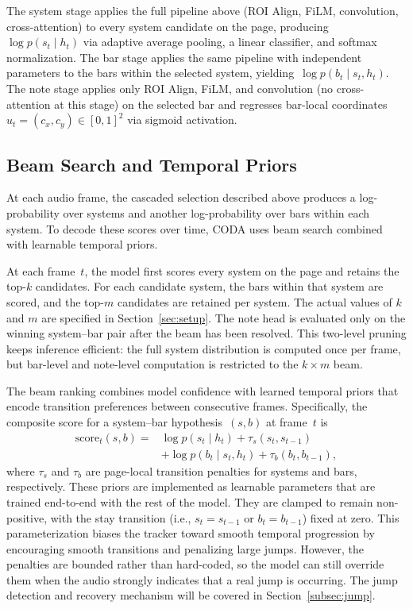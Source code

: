 The system stage applies the full pipeline above (ROI Align, FiLM, convolution, cross-attention) to every system candidate on the page, producing~$\log p(s_t \mid h_t)$ via adaptive average pooling, a linear classifier, and softmax normalization. The bar stage applies the same pipeline with independent parameters to the bars within the selected system, yielding~$\log p(b_t \mid s_t, h_t)$. The note stage applies only ROI Align, FiLM, and convolution (no cross-attention at this stage) on the selected bar and regresses bar-local coordinates~$u_t = (c_x, c_y) \in [0,1]^2$ via sigmoid activation.

\subsection{Beam Search and Temporal Priors}

At each audio frame, the cascaded selection described above produces a log-probability over systems and another log-probability over bars within each system. To decode these scores over time, CODA uses beam search combined with learnable temporal priors.

At each frame~$t$, the model first scores every system on the page and retains the top-$k$ candidates. For each candidate system, the bars within that system are scored, and the top-$m$ candidates are retained per system. The actual values of $k$ and $m$ are specified in Section~\ref{sec:setup}. The note head is evaluated only on the winning system--bar pair after the beam has been resolved. This two-level pruning keeps inference efficient: the full system distribution is computed once per frame, but bar-level and note-level computation is restricted to the $k \times m$ beam.

The beam ranking combines model confidence with learned temporal priors that encode transition preferences between consecutive frames. Specifically, the composite score for a system--bar hypothesis~$(s, b)$ at frame~$t$ is
\begin{equation}
\begin{split}
\mathrm{score}_t(s,b) = {} & \log p(s_t \mid h_t) + \tau_s(s_t, s_{t-1}) \\
& + \log p(b_t \mid s_t, h_t) + \tau_b(b_t, b_{t-1}),
\end{split}
\end{equation}
where $\tau_s$ and $\tau_b$ are page-local transition penalties for systems and bars, respectively. These priors are implemented as learnable parameters that are trained end-to-end with the rest of the model. They are clamped to remain non-positive, with the stay transition (i.e., $s_t = s_{t-1}$ or $b_t = b_{t-1}$) fixed at zero. This parameterization biases the tracker toward smooth temporal progression by encouraging smooth transitions and penalizing large jumps. However, the penalties are bounded rather than hard-coded, so the model can still override them when the audio strongly indicates that a real jump is occurring. The jump detection and recovery mechanism will be covered in Section~\ref{subsec:jump}.


